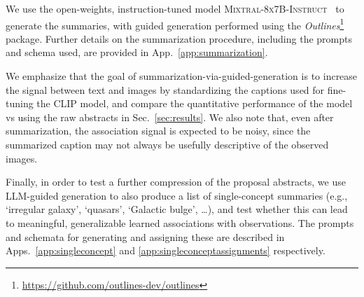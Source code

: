 \documentclass[10pt]{article} %
\newcommand{\package}[1]{\textsl{#1}\xspace}
\newcommand{\datafolder}[1]{\def\thedatafolder{#1}}
\begin{document}
We use the open-weights, instruction-tuned model \textsc{Mixtral-8x7B-Instruct}~\citep{jiang2024mixtral} to generate the summaries, with guided generation performed using the \package{Outlines}\footnote{\url{https://github.com/outlines-dev/outlines}} package. Further details on the summarization procedure, including the prompts and schema used, are provided in App.~\ref{app:summarization}.

We emphasize that the goal of summarization-via-guided-generation is to increase the signal between text and images by standardizing the captions used for fine-tuning the CLIP model, and compare the quantitative performance of the model vs using the raw abstracts in Sec.~\ref{sec:results}. We also note that, even after summarization, the association signal is expected to be noisy, since the summarized caption may not always be usefully descriptive of the observed images.

Finally, in order to test a further compression of the proposal abstracts, we use LLM-guided generation to also produce a list of single-concept summaries (e.g., `irregular galaxy', `quasars', `Galactic bulge', \ldots), and test whether this can lead to meaningful, generalizable learned associations with observations. The prompts and schemata for generating and assigning these are described in Apps.~\ref{app:singleconcept} and \ref{app:singleconceptassignments} respectively.

\datafolder{./plots/data/}
 
\end{document}
